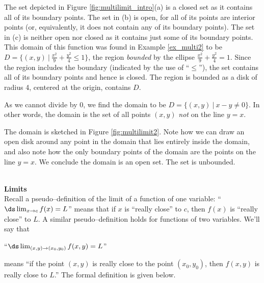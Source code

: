 The set depicted in Figure \ref{fig:multilimit_intro}(a) is a closed set as it contains all of its boundary points. The set in (b) is open, for all of its points are interior points (or, equivalently, it does not contain any of its boundary points). The set in (c) is neither open nor closed as it contains just some of its boundary points.\\

{This domain of this function was found in Example \ref{ex_multi2} to be $D = \{(x,y)\ |\ \frac{x^2}9+\frac{y^2}4\leq 1\}$, the region \textit{bounded} by the ellipse $\frac{x^2}9+\frac{y^2}4=1$. Since the region includes the boundary (indicated by the use of ``$\leq$''), the set contains all of its boundary points and hence is closed. The region is bounded as a disk of radius 4, centered at the origin, contains $D$.
}\\

{As we cannot divide by 0, we find the domain to be $D = \{(x,y)\ |\ x-y\neq 0\}$. In other words, the domain is the set of all points $(x,y)$ \emph{not} on the line $y=x$. 

The domain is sketched in Figure \ref{fig:multilimit2}. Note how we can draw an open disk around any point in the domain that lies entirely inside the domain, and also note how the only boundary points of the domain are the points on the line $y=x$. We conclude the domain is an open set. The set is unbounded.
}\\

\noindent\textbf{\large Limits}\\

Recall a pseudo--definition of the limit of a function of one variable: ``$\ds \lim_{x\to c}f(x) = L$'' means that if $x$ is ``really close'' to $c$, then $f(x)$ is ``really close'' to $L$. A similar pseudo--definition holds for functions of two variables. We'll say that 

\begin{center}
``$\ds \lim_{(x,y)\to (x_0,y_0)} f(x,y) = L$'' \end{center}
means ``if the point $(x,y)$ is really close to the point $(x_0,y_0)$, then $f(x,y)$ is really close to $L$.'' The formal definition is given below.


